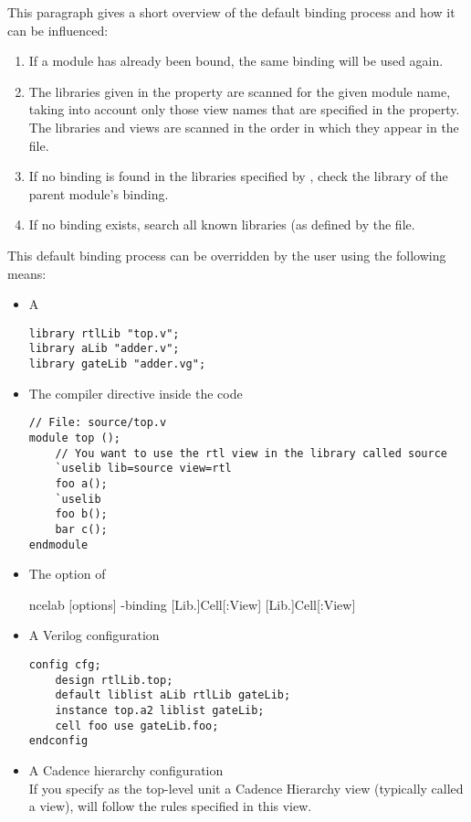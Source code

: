 This paragraph gives a short overview of the default binding process and how it
can be influenced:
\begin{enumerate}
    \item If a module has already been bound, the same binding will be used
 again.
    \item The libraries given in the  property are scanned for the
 given module name, taking into account only those view names that are
 specified in the  property. The libraries and views are scanned
 in the order in which they appear in the  file.
    \item If no binding is found in the libraries specified by ,
 check the library of the parent module's binding.
    \item If no binding exists, search all known libraries (as defined by the
  file.
\end{enumerate}

This default binding process can be overridden by the user using the following
means:
\begin{itemize}
    \item A 
 \begin{verbatim}
library rtlLib "top.v";
library aLib "adder.v";
library gateLib "adder.vg";
\end{verbatim}
    \item The  compiler directive inside the  code
 \begin{verbatim}
// File: source/top.v
module top ();
    // You want to use the rtl view in the library called source
    `uselib lib=source view=rtl
    foo a();
    `uselib
    foo b();
    bar c();
endmodule
\end{verbatim}
    \item The  option of 
 \begin{lstbashplain}
 ncelab [options] -binding [Lib.]Cell[:View] [Lib.]Cell[:View]
\end{lstbashplain}
    \item A Verilog configuration
 \begin{verbatim}
config cfg;
    design rtlLib.top;
    default liblist aLib rtlLib gateLib;
    instance top.a2 liblist gateLib;
    cell foo use gateLib.foo;
endconfig
\end{verbatim}
    \item A Cadence hierarchy configuration\\
 If you specify as the top-level unit a Cadence Hierarchy view (typically
 called a  view),  will follow the rules specified in
 this view.
\end{itemize}


